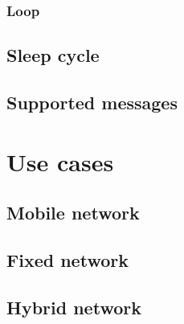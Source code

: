 			\subsubsection{Loop}
			
		\subsection{Sleep cycle}
		
			
		\subsection{Supported messages}
				
			
	\section{Use cases}
		
		
		\subsection{Mobile network}
		
		\subsection{Fixed network}
		
		\subsection{Hybrid network}